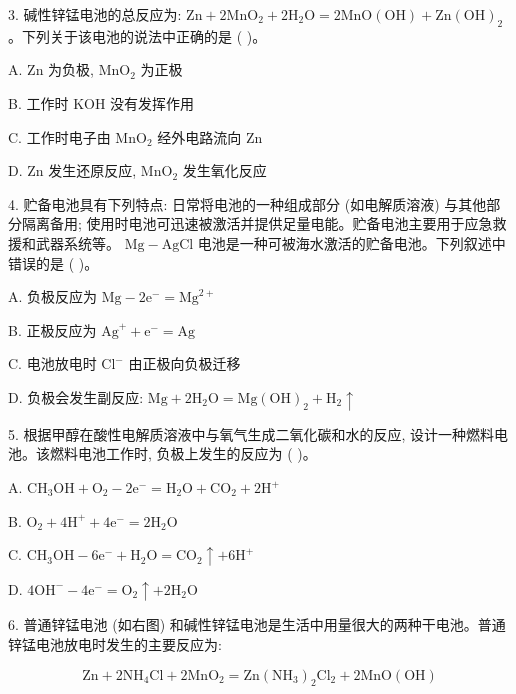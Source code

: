 \documentclass[10pt]{article}
\begin{document}
3. 碱性锌锰电池的总反应为: \(\mathrm{{Zn}} + 2{\mathrm{{MnO}}}_{2} + 2{\mathrm{H}}_{2}\mathrm{O} = 2\mathrm{{MnO}}\left( \mathrm{{OH}}\right) + \mathrm{{Zn}}{\left( \mathrm{{OH}}\right) }_{2}\) 。下列关于该电池的说法中正确的是 ( )。

A. \(\mathrm{{Zn}}\) 为负极, \({\mathrm{{MnO}}}_{2}\) 为正极

B. 工作时 \(\mathrm{{KOH}}\) 没有发挥作用

C. 工作时电子由 \({\mathrm{{MnO}}}_{2}\) 经外电路流向 \(\mathrm{{Zn}}\)

D. \(\mathrm{{Zn}}\) 发生还原反应, \({\mathrm{{MnO}}}_{2}\) 发生氧化反应

4. 贮备电池具有下列特点: 日常将电池的一种组成部分 (如电解质溶液) 与其他部分隔离备用; 使用时电池可迅速被激活并提供足量电能。贮备电池主要用于应急救援和武器系统等。 \(\mathrm{{Mg}} - \mathrm{{AgCl}}\) 电池是一种可被海水激活的贮备电池。下列叙述中错误的是 ( )。

A. 负极反应为 \(\mathrm{{Mg}} - 2{\mathrm{e}}^{ - } = {\mathrm{{Mg}}}^{2 + }\)

B. 正极反应为 \({\mathrm{{Ag}}}^{ + } + {\mathrm{e}}^{ - } = \mathrm{{Ag}}\)

C. 电池放电时 \({\mathrm{{Cl}}}^{ - }\) 由正极向负极迁移

D. 负极会发生副反应: \(\mathrm{{Mg}} + 2{\mathrm{H}}_{2}\mathrm{O} = \mathrm{{Mg}}{\left( \mathrm{{OH}}\right) }_{2} + {\mathrm{H}}_{2} \uparrow\)

5. 根据甲醇在酸性电解质溶液中与氧气生成二氧化碳和水的反应, 设计一种燃料电池。该燃料电池工作时, 负极上发生的反应为 ( )。

A. \({\mathrm{{CH}}}_{3}\mathrm{{OH}} + {\mathrm{O}}_{2} - 2{\mathrm{e}}^{ - } = {\mathrm{H}}_{2}\mathrm{O} + {\mathrm{{CO}}}_{2} + 2{\mathrm{H}}^{ + }\)

B. \({\mathrm{O}}_{2} + 4{\mathrm{H}}^{ + } + 4{\mathrm{e}}^{ - } = 2{\mathrm{H}}_{2}\mathrm{O}\)

C. \({\mathrm{{CH}}}_{3}\mathrm{{OH}} - 6{\mathrm{e}}^{ - } + {\mathrm{H}}_{2}\mathrm{O} = {\mathrm{{CO}}}_{2} \uparrow + 6{\mathrm{H}}^{ + }\)

D. \(4{\mathrm{{OH}}}^{ - } - 4{\mathrm{e}}^{ - } = {\mathrm{O}}_{2} \uparrow + 2{\mathrm{H}}_{2}\mathrm{O}\)

6. 普通锌锰电池 (如右图) 和碱性锌锰电池是生活中用量很大的两种干电池。普通锌锰电池放电时发生的主要反应为:

\[
\mathrm{{Zn}} + 2{\mathrm{{NH}}}_{4}\mathrm{{Cl}} + 2{\mathrm{{MnO}}}_{2} = \mathrm{{Zn}}{\left( {\mathrm{{NH}}}_{3}\right) }_{2}{\mathrm{{Cl}}}_{2} + 2\mathrm{{MnO}}\left( \mathrm{{OH}}\right)
\]
\end{document}
